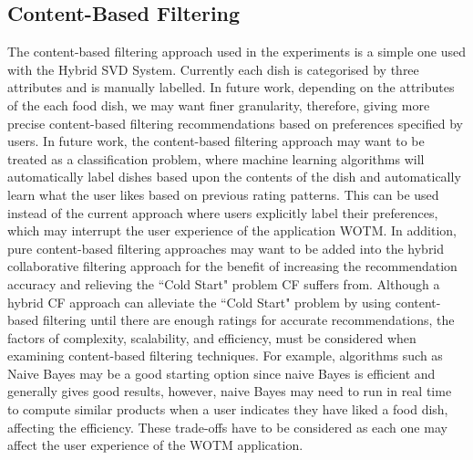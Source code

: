 \subsection{Content-Based Filtering}
The content-based filtering approach used in the experiments is a simple one used with the Hybrid SVD System. Currently each dish is categorised by three attributes and is manually labelled. In future work, depending on the attributes of the each food dish, we may want finer granularity, therefore, giving more precise content-based filtering recommendations based on preferences specified by users.  In future work, the content-based filtering approach may want to be treated as a classification problem, where machine learning algorithms will automatically label dishes based upon the contents of the dish and automatically learn what the user likes based on previous rating patterns. This can be used instead of the current approach where users explicitly label their preferences, which may interrupt the user experience of the application WOTM. In addition, pure content-based filtering approaches may want to be added into the hybrid collaborative filtering approach for the benefit of increasing the recommendation accuracy and relieving the ``Cold Start" problem CF suffers from. Although a hybrid CF approach can alleviate the ``Cold Start" problem by using content-based filtering until there are enough ratings for accurate recommendations, the factors of complexity, scalability, and efficiency, must be considered when examining content-based filtering techniques. For example, algorithms such as Naive Bayes may be a good starting option since naive Bayes is efficient and generally gives good results, however, naive Bayes may need to run in real time to compute similar products when a user indicates they have liked a food dish, affecting the efficiency. These trade-offs have to be considered as each one may affect the user experience of the WOTM application. 

